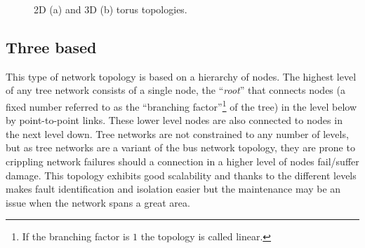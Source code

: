 \begin{figure}
\caption{2D (a) and 3D (b) torus topologies.}
\label{fig:torus}
\centering
\setlength{\fboxrule}{0.5pt}%
\hfill
{}

\end{figure}

\subsection{Three based}
This type of network topology is based on a hierarchy of nodes. The highest
level of any tree network consists of a single node, the ``\textit{root}'' that
connects nodes (a fixed number referred to as the ``branching
factor''\footnote{If the branching factor is \(1\) the topology is called
linear.} of the tree) in the level below by point-to-point links. These lower
level nodes are also connected to nodes in the next level down. Tree networks
are not constrained to any number of levels, but as tree networks are a variant
of the bus network topology, they are prone to crippling network failures should
a connection in a higher level of nodes fail/suffer damage.
This topology exhibits good scalability and thanks to the different levels makes
fault identification and isolation easier but the maintenance may be an issue
when the network spans a great area.


